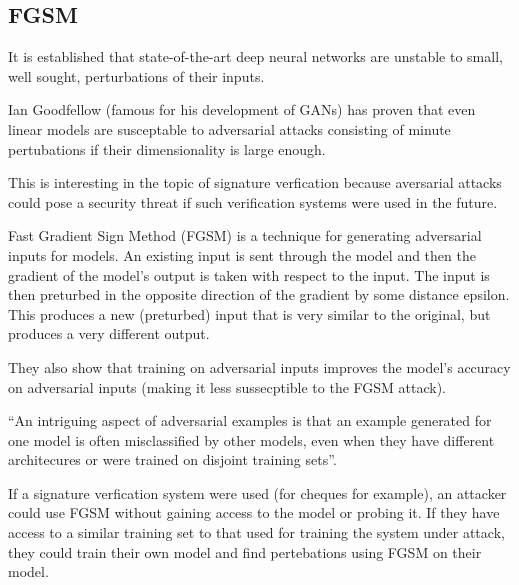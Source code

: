 \subsection{FGSM}

It is established that state-of-the-art deep neural networks are unstable to small, well sought, perturbations of their inputs\cite{deep_fool}.

Ian Goodfellow (famous for his development of GANs) has proven that even linear models are susceptable to adversarial attacks consisting of minute pertubations if their dimensionality is large enough\cite{goodfellow}.

This is interesting in the topic of signature verfication because aversarial attacks could pose a security threat if such verification systems were used in the future.

Fast Gradient Sign Method (FGSM) is a technique for generating adversarial inputs for models.
An existing input is sent through the model and then the gradient of the model's output is taken with respect to the input.
The input is then preturbed in the opposite direction of the gradient by some distance epsilon.
This produces a new (preturbed) input that is very similar to the original, but produces a very different output.

They also show that training on adversarial inputs improves the model's accuracy on adversarial inputs (making it less sussecptible to the FGSM attack).

``An intriguing aspect of adversarial examples is that an example generated for one model is often
misclassified by other models, even when they have different architecures or were trained on disjoint training sets''\cite{goodfellow}.

If a signature verfication system were used (for cheques for example), an attacker could use FGSM without gaining access to the model or probing it.
If they have access to a similar training set to that used for training the system under attack, they could train their own model and find pertebations using FGSM on their model.



